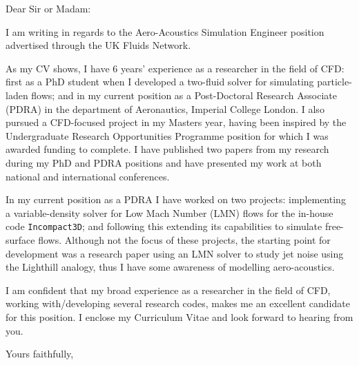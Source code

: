 \documentclass{letter}
\begin{document}
\begin{letter}{}%

  \opening{Dear Sir or Madam:}

  I am writing in regards to the Aero-Acoustics Simulation Engineer position advertised through the
  UK Fluids Network.

  As my CV shows, I have 6 years' experience as a researcher in the field of CFD: first as a PhD
  student when I developed a two-fluid solver for simulating particle-laden flows; and in my current
  position as a Post-Doctoral Research Associate (PDRA) in the department of Aeronautics, Imperial
  College London.
  I also pursued a CFD-focused project in my Masters year, having been inspired by the Undergraduate
  Research Opportunities Programme position for which I was awarded funding to complete.
  I have published two papers from my research during my PhD and PDRA positions and have presented
  my work at both national and international conferences.

  In my current position as a PDRA I have worked on two projects: implementing a variable-density
  solver for Low Mach Number (LMN) flows for the in-house code \texttt{Incompact3D}; and following
  this extending its capabilities to simulate free-surface flows.
  Although not the focus of these projects, the starting point for development was a research paper
  using an LMN solver to study jet noise using the Lighthill analogy, thus I have some awareness of
  modelling aero-acoustics.
  
  I am confident that my broad experience as a researcher in the field of CFD, working
  with/developing several research codes, makes me an excellent candidate for this position.
  I enclose my Curriculum Vitae and look forward to hearing from you.

  \closing{Yours faithfully,}
  
\end{letter}
\end{document}

